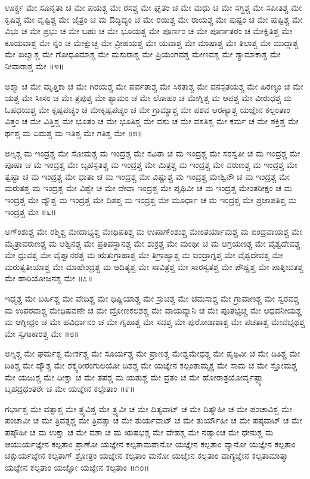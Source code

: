 ಊರ್ಕ್ಚ ಮೇ ಸೂನೃತಾ ಚ ಮೇ ಪಯಶ್ಚ ಮೇ ರಸಶ್ಚ ಮೇ ಘೃತಂ ಚ ಮೇ ಮಧು ಚ ಮೇ ಸಗ್ಧಿಶ್ಚ ಮೇ ಸಪೀತಿಶ್ಚ ಮೇ ಕೃಷಿಶ್ಚ ಮೇ ವೃಷ್ಟಿಶ್ಚ ಮೇ ಜೈತ್ರಂ ಚ ಮ ಔದ್ಭಿದ್ಯಂ ಚ ಮೇ ರಯಿಶ್ಚ ಮೇ ರಾಯಶ್ಚ ಮೇ ಪುಷ್ಟಂ ಚ ಮೇ ಪುಷ್ಟಿಶ್ಚ ಮೇ ವಿಭು ಚ ಮೇ ಪ್ರಭು ಚ ಮೇ ಬಹು ಚ ಮೇ ಭೂಯಶ್ಚ ಮೇ ಪೂರ್ಣಂ ಚ ಮೇ ಪೂರ್ಣತರಂ ಚ ಮೇಕ್ಷಿತಿಶ್ಚ ಮೇ ಕೂಯವಾಶ್ಚ ಮೇ ನ್ನಂ ಚ ಮೇಕ್ಷುಚ್ಚ ಮೇ ವ್ರೀಹಯಶ್ಚ ಮೇ ಯವಾಶ್ಚ ಮೇ ಮಾಷಾಶ್ಚ ಮೇ ತಿಲಾಶ್ಚ ಮೇ ಮುದ್ಗಾಶ್ಚ ಮೇ ಖಲ್ವಾಶ್ಚ ಮೇ ಗೋಧೂಮಾಶ್ಚ ಮೇ ಮಸುರಾಶ್ಚ ಮೇ ಪ್ರಿಯಂಗವಶ್ಚ ಮೇಣವಶ್ಚ ಮೇ ಶ್ಯಾಮಾಕಾಶ್ಚ ಮೇ ನೀವಾರಾಶ್ಚ ಮೇ ॥೪॥

ಅಶ್ಮಾ ಚ ಮೇ ಮೃತ್ತಿಕಾ ಚ ಮೇ ಗಿರಯಶ್ಚ ಮೇ ಪರ್ವತಾಶ್ಚ ಮೇ ಸಿಕತಾಶ್ಚ ಮೇ ವನಸ್ಪತಯಶ್ಚ ಮೇ ಹಿರಣ್ಯಂ ಚ ಮೇ ಯಶ್ಚ ಮೇ ಸೀಸಂ ಚ ಮೇ ತ್ರಪುಶ್ಚ ಮೇ ಶ್ಯಾಮಂ ಚ ಮೇ ಲೋಹಂ ಚ ಮೇಗ್ನಿಶ್ಚ ಮ ಆಪಶ್ಚ ಮೇ ವೀರುಧಶ್ಚ ಮ ಓಷಧಯಶ್ಚ ಮೇ ಕೃಷ್ಟಪಚ್ಯಂ ಚ ಮೇಕೃಷ್ಟಪಚ್ಯಂ ಚ ಮೇ ಗ್ರಾಮ್ಯಾಶ್ಚ ಮೇ ಪಶವ ಆರಣ್ಯಾಶ್ಚ ಯಜ್ಞೇನ ಕಲ್ಪಂತಾಂ ವಿತ್ತಂ ಚ ಮೇ ವಿತ್ತಿಶ್ಚ ಮೇ ಭೂತಂ ಚ ಮೇ ಭೂತಿಶ್ಚ ಮೇ ವಸು ಚ ಮೇ ವಸತಿಶ್ಚ ಮೇ ಕರ್ಮ ಚ ಮೇ ಶಕ್ತಿಶ್ಚ ಮೇ ರ್ಥಶ್ಚ ಮ ಏಮಶ್ಚ ಮ ಇತಿಶ್ಚ ಮೇ ಗತಿಶ್ಚ ಮೇ ॥೫॥

ಅಗ್ನಿಶ್ಚ ಮ ಇಂದ್ರಶ್ಚ ಮೇ ಸೋಮಶ್ಚ ಮ ಇಂದ್ರಶ್ಚ ಮೇ ಸವಿತಾ ಚ ಮ ಇಂದ್ರಶ್ಚ ಮೇ ಸರಸ್ವತೀ ಚ ಮ ಇಂದ್ರಶ್ಚ ಮೇ ಪೂಷಾ ಚ ಮ ಇಂದ್ರಶ್ಚ ಮೇ ಬೃಹಸ್ಪತಿಶ್ಚ ಮ ಇಂದ್ರಶ್ಚ ಮೇ ಮಿತ್ರಶ್ಚ ಮ ಇಂದ್ರಶ್ಚ ಮೇ ವರುಣಶ್ಚ ಮ ಇಂದ್ರಶ್ಚ ಮೇ ತ್ವಷ್ಟಾ ಚ ಮ ಇಂದ್ರಶ್ಚ ಮೇ ಧಾತಾ ಚ ಮ ಇಂದ್ರಶ್ಚ ಮೇ ವಿಷ್ಣುಶ್ಚ ಮ ಇಂದ್ರಶ್ಚ ಮೇಶ್ವಿನೌ ಚ ಮ ಇಂದ್ರಶ್ಚ ಮೇ ಮರುತಶ್ಚ ಮ ಇಂದ್ರಶ್ಚ ಮೇ ವಿಶ್ವೇ ಚ ಮೇ ದೇವಾ ಇಂದ್ರಶ್ಚ ಮೇ ಪೃಥಿವೀ ಚ ಮ ಇಂದ್ರಶ್ಚ ಮೇಂತರೀಕ್ಷಂ ಚ ಮ ಇಂದ್ರಶ್ಚ ಮೇ ದ್ಯೌಶ್ಚ ಮ ಇಂದ್ರಶ್ಚ ಮೇ ದಿಶಶ್ಚ ಮ ಇಂದ್ರಶ್ಚ ಮೇ ಮೂರ್ಧಾ ಚ ಮ ಇಂದ್ರಶ್ಚ ಮೇ ಪ್ರಜಾಪತಿಶ್ಚ ಮ ಇಂದ್ರಶ್ಚ ಮೇ ॥೬॥

ಅಗ್ಂಶುಶ್ಚ ಮೇ ರಶ್ಮಿಶ್ಚ ಮೇದಾಭ್ಯಶ್ಚ ಮೇಧಿಪತಿಶ್ಚ ಮ ಉಪಾಗ್ಂಶುಶ್ಚ ಮೇಂತರ್ಯಾಮಶ್ಚ ಮ ಐಂದ್ರವಾಯಶ್ಚ ಮೇ ಮೈತ್ರಾವರುಣಶ್ಚ ಮ ಆಶ್ವಿನಶ್ಚ ಮೇ ಪ್ರತಿಪಸ್ಥಾನಶ್ಚ ಮೇ ಶುಕ್ರಶ್ಚ ಮೇ ಮಂಥೀ ಚ ಮ ಆಗ್ರಯಣಶ್ಚ ಮೇ ವೈಶ್ವದೇವಶ್ಚ ಮೇ ಧ್ರುವಶ್ಚ ಮೇ ವೈಶ್ವಾನರಶ್ಚ ಮ ಋತುಗ್ರಾಹಾಶ್ಚ ಮೇ ತಿಗ್ರಾಹ್ಯಾಶ್ಚ ಮ ಐಂದ್ರಾಗ್ನಶ್ಚ ಮೇ ವೈಶ್ವದೇವಶ್ಚ ಮೇ ಮರುತ್ವತೀಯಾಶ್ಚ ಮೇ ಮಾಹೇಂದ್ರಶ್ಚ ಮ ಆದಿತ್ಯಶ್ಚ ಮೇ ಸಾವಿತ್ರಶ್ಚ ಮೇ ಸಾರಸ್ವತಶ್ಚ ಮೇ ಪೌಷ್ಣಶ್ಚ ಮೇ ಪಾತ್ನೀವತಶ್ಚ ಮೇ ಹಾರಿಯೋಜನಶ್ಚ ಮೇ ॥೭॥

ಇಧ್ಮಶ್ಚ ಮೇ ಬರ್ಹಿಶ್ಚ ಮೇ ವೇದಿಶ್ಚ ಮೇ ಧಿಷ್ಣಿಯಾಶ್ಚ ಮೇ ಸ್ರುಚಶ್ಚ ಮೇ ಚಮಸಾಶ್ಚ ಮೇ ಗ್ರಾವಾಣಶ್ಚ ಮೇ ಸ್ವರವಶ್ಚ ಮ ಉಪರವಾಶ್ಚ ಮೇಧಿಷವಣೇ ಚ ಮೇ ದ್ರೋಣಕಲಶಶ್ಚ ಮೇ ವಾಯವ್ಯಾನಿ ಚ ಮೇ ಪೂತಭೃಚ್ಚ ಮೇ ಆಧವನೀಯಶ್ಚ ಮ ಆಗ್ನೀಧ್ರಂ ಚ ಮೇ ಹವಿರ್ಧಾನಂ ಚ ಮೇ ಗೃಹಾಶ್ಚ ಮೇ ಸದಶ್ಚ ಮೇ ಪುರೋಡಾಶಾಶ್ಚ ಮೇ ಪಚತಾಶ್ಚ ಮೇವಭೃಥಶ್ಚ ಮೇ ಸ್ವಗಾಕಾರಶ್ಚ ಮೇ ॥೮॥

ಅಗ್ನಿಶ್ಚ ಮೇ ಘರ್ಮಶ್ಚ ಮೇರ್ಕಶ್ಚ ಮೇ ಸೂರ್ಯಶ್ಚ ಮೇ ಪ್ರಾಣಶ್ಚ ಮೇಶ್ವಮೇಧಶ್ಚ ಮೇ ಪೃಥಿವೀ ಚ ಮೇ ದಿತಿಶ್ಚ ಮೇ ದಿತಿಶ್ಚ ಮೇ ದ್ಯೌಶ್ಚ ಮೇ ಶಕ್ಕ್ವರೀರಂಗುಲಯೋ ದಿಶಶ್ಚ ಮೇ ಯಜ್ಞೇನ ಕಲ್ಪಂತಾಮೃಕ್ಚ ಮೇ ಸಾಮ ಚ ಮೇ ಸ್ತೋಮಶ್ಚ ಮೇ ಯಜುಶ್ಚ ಮೇ ದೀಕ್ಷಾ ಚ ಮೇ ತಪಶ್ಚ ಮ ಋತುಶ್ಚ ಮೇ ವ್ರತಂ ಚ ಮೇ ಹೋರಾತ್ರಯೋರ್ವೃಷ್ಟ್ಯಾ ಬೃಹದ್ರಥಂತರೇ ಚ ಮೇ ಯಜ್ಞೇನ ಕಲ್ಪೇತಾಂ ॥೯॥

ಗರ್ಭಾಶ್ಚ ಮೇ ವತ್ಸಾಶ್ಚ ಮೇ ತ್ರ್ಯವಿಶ್ಚ ಮೇ ತ್ರ್ಯವೀ ಚ ಮೇ ದಿತ್ಯವಾಟ್ ಚ ಮೇ ದಿತ್ಯೌಹೀ ಚ ಮೇ ಪಂಚಾವಿಶ್ಚ ಮೇ ಪಂಚಾವೀ ಚ ಮೇ ತ್ರಿವತ್ಸಶ್ಚ ಮೇ ತ್ರಿವತ್ಸಾ ಚ ಮೇ ತುರ್ಯವಾಟ್ ಚ ಮೇ ತುರ್ಯೌಹೀ ಚ ಮೇ ಪಷ್ಠವಾಟ್ ಚ ಮೇ ಪಷ್ಠೌಹೀ ಚ ಮ ಉಕ್ಷಾ ಚ ಮೇ ವಶಾ ಚ ಮ ಋಷಭಶ್ಚ ಮೇ ವೇಹಶ್ಚ ಮೇ ನಡ್ವಾಂಚ ಮೇ ಧೇನುಶ್ಚ ಮ ಆಯುರ್ಯಜ್ಞೇನ ಕಲ್ಪತಾಂ ಪ್ರಾಣೋ ಯಜ್ಞೇನ ಕಲ್ಪತಾಮಪಾನೋ ಯಜ್ಞೇನ ಕಲ್ಪತಾಂ ವ್ಯಾನೋ ಯಜ್ಞೇನ ಕಲ್ಪತಾಂ ಚಕ್ಷುರ್ಯಜ್ಞೇನ ಕಲ್ಪತಾಗ್ ಶ್ರೋತ್ರಂ ಯಜ್ಞೇನ ಕಲ್ಪತಾಂ ಮನೋ ಯಜ್ಞೇನ ಕಲ್ಪತಾಂ ವಾಗ್ಯಜ್ಞೇನ ಕಲ್ಪತಾಮಾತ್ಮಾ ಯಜ್ಞೇನ ಕಲ್ಪತಾಂ ಯಜ್ಞೋ ಯಜ್ಞೇನ ಕಲ್ಪತಾಂ ॥೧೦॥

